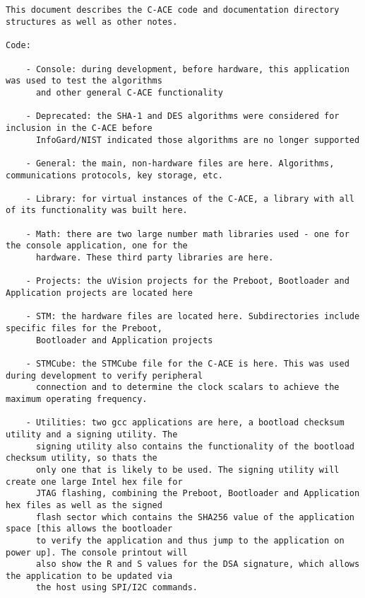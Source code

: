 \documentclass{article}
\begin{document}
\begin{Verbatim}[fontsize=\small,highlightcolor=lightgray,highlightlines={5,38,58,78}]


This document describes the C-ACE code and documentation directory structures as well as other notes.

Code:

    - Console: during development, before hardware, this application was used to test the algorithms
      and other general C-ACE functionality

    - Deprecated: the SHA-1 and DES algorithms were considered for inclusion in the C-ACE before
      InfoGard/NIST indicated those algorithms are no longer supported

    - General: the main, non-hardware files are here. Algorithms, communications protocols, key storage, etc.

    - Library: for virtual instances of the C-ACE, a library with all of its functionality was built here.

    - Math: there are two large number math libraries used - one for the console application, one for the
      hardware. These third party libraries are here.

    - Projects: the uVision projects for the Preboot, Bootloader and Application projects are located here

    - STM: the hardware files are located here. Subdirectories include specific files for the Preboot,
      Bootloader and Application projects

    - STMCube: the STMCube file for the C-ACE is here. This was used during development to verify peripheral
      connection and to determine the clock scalars to achieve the maximum operating frequency.

    - Utilities: two gcc applications are here, a bootload checksum utility and a signing utility. The
      signing utility also contains the functionality of the bootload checksum utility, so thats the
      only one that is likely to be used. The signing utility will create one large Intel hex file for
      JTAG flashing, combining the Preboot, Bootloader and Application hex files as well as the signed
      flash sector which contains the SHA256 value of the application space [this allows the bootloader
      to verify the application and thus jump to the application on power up]. The console printout will
      also show the R and S values for the DSA signature, which allows the application to be updated via
      the host using SPI/I2C commands.



\end{Verbatim}
\end{document}
